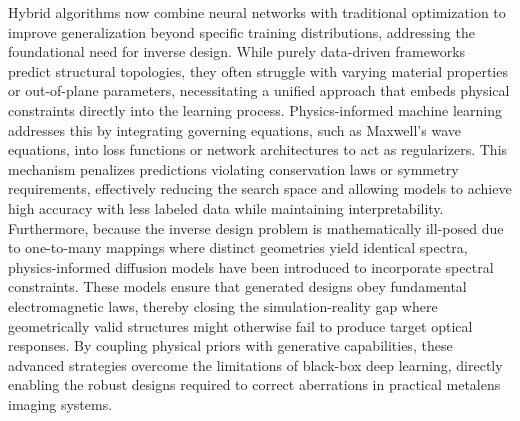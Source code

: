 \documentclass[11pt]{article}
\begin{document}
Hybrid algorithms now combine neural networks with traditional optimization to improve generalization beyond specific training distributions, addressing the foundational need for inverse design. While purely data-driven frameworks predict structural topologies, they often struggle with varying material properties or out-of-plane parameters, necessitating a unified approach that embeds physical constraints directly into the learning process. Physics-informed machine learning addresses this by integrating governing equations, such as Maxwell's wave equations, into loss functions or network architectures to act as regularizers. \citep{doi_10_21070_acopen_10_2025_12939_5a404b4e} \citep{doi_10_1109_tmtt_2026_3658422_94a01e71} This mechanism penalizes predictions violating conservation laws or symmetry requirements, effectively reducing the search space and allowing models to achieve high accuracy with less labeled data while maintaining interpretability. \citep{doi_10_71465_fapm546_bda368a5} Furthermore, because the inverse design problem is mathematically ill-posed due to one-to-many mappings where distinct geometries yield identical spectra, physics-informed diffusion models have been introduced to incorporate spectral constraints. These models ensure that generated designs obey fundamental electromagnetic laws, thereby closing the simulation-reality gap where geometrically valid structures might otherwise fail to produce target optical responses. By coupling physical priors with generative capabilities, these advanced strategies overcome the limitations of black-box deep learning, directly enabling the robust designs required to correct aberrations in practical metalens imaging systems. \citep{doi_10_1002_adom_202100548_6789fa4c} \citep{doi_10_1002_adpr_202300158_66d61883} \citep{doi_10_71465_fapm546_bda368a5}
\end{document}
